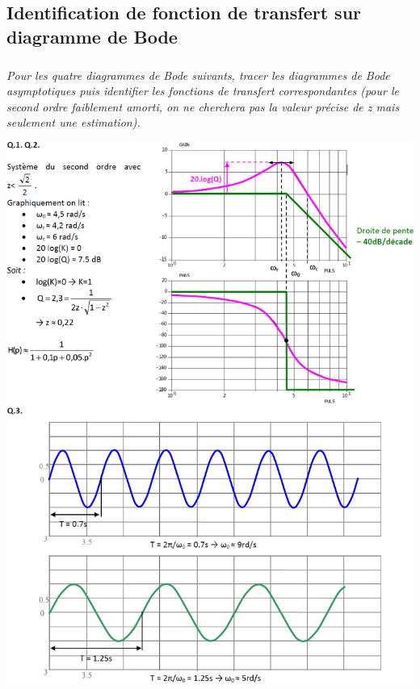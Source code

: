 \documentclass[10pt,fleqn]{article} %
\begin{document}
\begin{multicols}{2}
\section*{Identification de fonction de transfert sur diagramme de Bode}
\subparagraph*{}
\textit{Pour les quatre diagrammes de Bode suivants, tracer les diagrammes de Bode asymptotiques puis identifier les fonctions de transfert correspondantes (pour le second ordre faiblement amorti, on ne cherchera pas la valeur précise de z mais seulement une estimation).}

\ifprof
\else
\end{multicols}
\fi

\fi


\ifprof
\begin{center}
\includegraphics[width=\textwidth]{images/cor_01}


\end{center}
\end{document}
